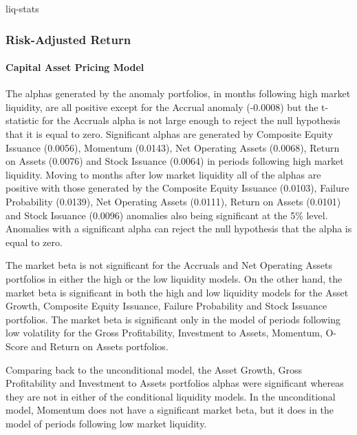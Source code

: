 \documentclass[a4paper,12pt]{article}                 %
\begin{document}
{liq-stats}

\subsubsection{Risk-Adjusted Return}
\paragraph{Capital Asset Pricing Model}
The alphas generated by the anomaly portfolios, in months following high market liquidity, are all positive except for the Accrual anomaly (-0.0008) but the t-statistic for the Accruals alpha is not large enough to reject the null hypothesis that it is equal to zero. Significant alphas are generated by Composite Equity Issuance (0.0056), Momentum (0.0143), Net Operating Assets (0.0068), Return on Assets (0.0076) and Stock Issuance (0.0064) in periods following high market liquidity. Moving to months after low market liquidity all of the alphas are positive with those generated by the Composite Equity Issuance (0.0103), Failure Probability (0.0139), Net Operating Assets (0.0111), Return on Assets (0.0101) and Stock Issuance (0.0096) anomalies also being significant at the 5\% level. Anomalies with a significant alpha can reject the null hypothesis that the alpha is equal to zero.

The market beta is not significant for the Accruals and Net Operating Assets portfolios in either the high or the low liquidity models. On the other hand, the market beta is significant in both the high and low liquidity models for the Asset Growth, Composite Equity Issuance, Failure Probability and Stock Issuance portfolios. The market beta is significant only in the model of periods following low volatility for the Gross Profitability, Investment to Assets, Momentum, O-Score and Return on Assets portfolios.

Comparing back to the unconditional model, the Asset Growth, Gross Profitability and Investment to Assets portfolios alphas were significant whereas they are not in either of the conditional liquidity models. In the unconditional model, Momentum does not have a significant market beta, but it does in the model of periods following low market liquidity. 
\end{document}
